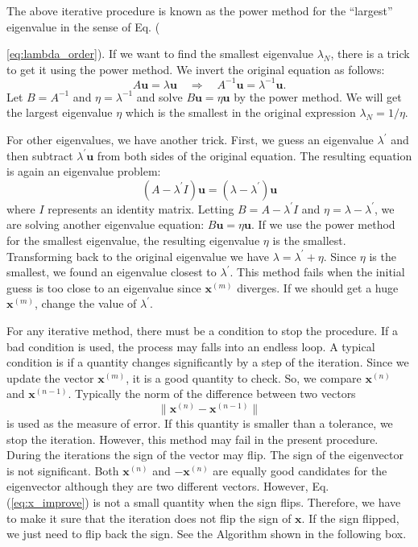 The above iterative procedure is known as the power method for the ``largest'' eigenvalue in the sense of Eq. ({\ref{eq:lambda_order}).
If we want to find the smallest eigenvalue $\lambda_N$, there is a trick to get it using the power method.  We invert the original equation as follows:
\begin{equation}
A \mathbf{u} = \lambda \mathbf{u} \quad \Longrightarrow \quad A^{-1} \mathbf{u} = \lambda^{-1} \mathbf{u}.
\end{equation}
Let $B=A^{-1}$ and $\eta=\lambda^{-1}$ and solve $B \mathbf{u}=\eta \mathbf{u}$ by the power method.  We will get the largest eigenvalue $\eta$ which is the smallest in the original expression $\lambda_N=1/\eta$.  

For other eigenvalues, we have another trick.  First, we guess an eigenvalue $\lambda^\prime$ and then subtract $\lambda^\prime \mathbf{u}$ from both sides of the original equation. The resulting equation is again an eigenvalue problem:
\begin{equation}
(A - \lambda^\prime I) \mathbf{u} = (\lambda-\lambda^\prime) \mathbf{u}
\end{equation}
where $I$ represents an identity matrix.  Letting $B=A-\lambda^\prime I$ and $\eta=\lambda-\lambda^\prime$, we are solving another eigenvalue equation: $B\mathbf{u}=\eta \mathbf{u}$.  If we use the power method for the smallest eigenvalue,  the resulting eigenvalue $\eta$ is the smallest.  Transforming back to the original eigenvalue we have $\lambda = \lambda^\prime + \eta$.  Since $\eta$ is the smallest, we found an eigenvalue closest to $\lambda^\prime$. This method fails when the initial guess is too close to an eigenvalue since $\mathbf{x}^{(m)}$ diverges.  If we should get a huge $\mathbf{x}^{(m)}$,  change the value of $\lambda^\prime$.

For any iterative method, there must be a condition to stop the procedure. If a bad condition is used, the process may falls into an endless loop.  A typical condition is if a quantity changes significantly by a step of the iteration. Since we update
the vector $\mathbf{x}^{(m)}$, it is a good quantity to check.
So, we compare $\mathbf{x}^{(n)}$ and $\mathbf{x}^{(n-1)}$.  Typically the norm of the difference between two vectors 
\begin{equation}\label{eq:x_improve}
\|\mathbf{x}^{(n)}- \mathbf{x}^{(n-1)}\|
\end{equation}
is used as the measure of error.  If this quantity is smaller than a tolerance, we stop the iteration.
However, this method may fail in the present procedure.  During the iterations the sign of the vector may flip. The sign of the eigenvector is not significant. Both $\mathbf{x}^{(n)}$ and $-\mathbf{x}^{(n)}$ are equally good candidates for the eigenvector although they are two different vectors.  However, Eq. (\ref{eq:x_improve}) is not a small quantity when the sign flips.  Therefore, we have to make it sure that the iteration does not flip the sign of $\mathbf{x}$. If the sign flipped, we just need to flip back the sign.  See the Algorithm shown in the following box.

}
